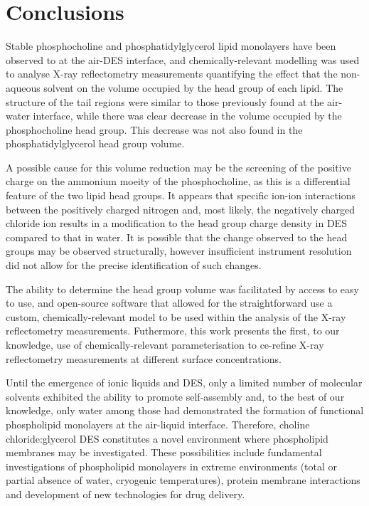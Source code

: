 \documentclass[twoside,twocolumn,9pt]{article}
\begin{document}
\section{Conclusions}
Stable phosphocholine and phosphatidylglycerol lipid monolayers have been observed to at the air-DES interface, and chemically-relevant modelling was used to analyse X-ray reflectometry measurements quantifying the effect that the non-aqueous solvent on the volume occupied by the head group of each lipid. The structure of the tail regions were similar to those previously found at the air-water interface, while there was clear decrease in the volume occupied by the phosphocholine head group. This decrease was not also found in the phosphatidylglycerol head group volume. 

A possible cause for this volume reduction may be the screening of the positive charge on the ammonium moeity of the phosphocholine, as this is a differential feature of the two lipid head groups. It appears that specific ion-ion interactions between the positively charged nitrogen and, most likely, the negatively charged chloride ion results in a modification to the head group charge density in DES compared to that in water. It is possible that the change observed to the head groups may be observed structurally, however insufficient instrument resolution did not allow for the precise identification of such changes. 

The ability to determine the head group volume was facilitated by access to easy to use, and open-source software that allowed for the straightforward use a custom, chemically-relevant model to be used within the analysis of the X-ray reflectometry measurements. Futhermore, this work presents the first, to our knowledge, use of chemically-relevant parameterisation to ce-refine X-ray reflectometry measurements at different surface concentrations. 

Until the emergence of ionic liquids and DES, only a limited number of molecular solvents exhibited the ability to promote self-assembly and, to the best of our knowledge, only water among those had demonstrated the formation of functional phospholipid monolayers at the air-liquid interface. Therefore, choline chloride:glycerol DES constitutes a novel environment where phospholipid membranes may be investigated. These possibilities include fundamental investigations of phospholipid monolayers in extreme environments (total or partial absence of water, cryogenic temperatures), protein membrane interactions and development of new technologies for drug delivery.
\end{document}

